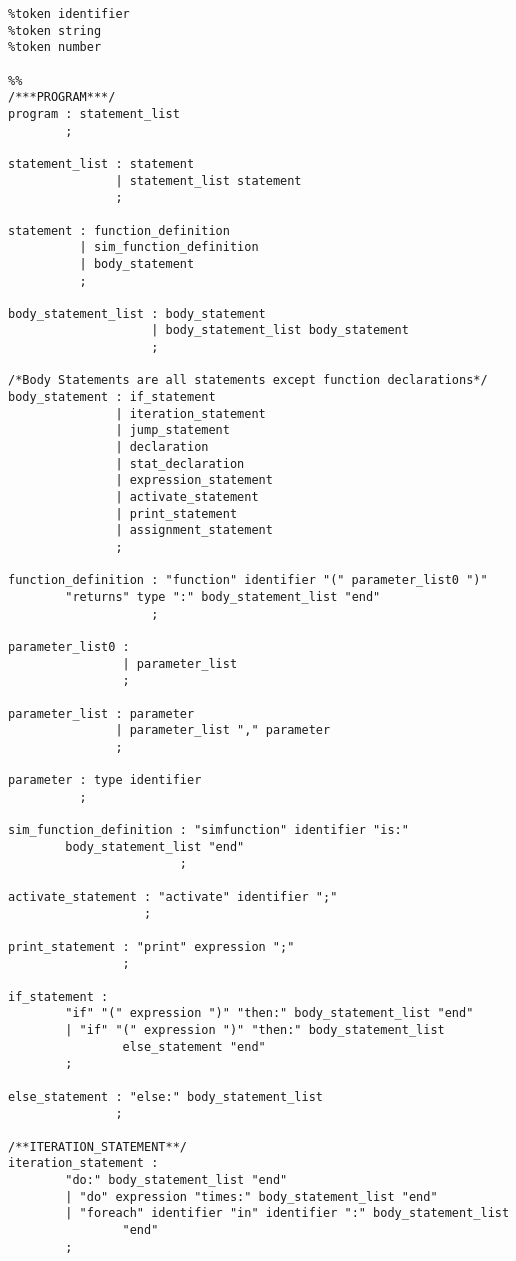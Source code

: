 \begin{singlespacing}
\begin{verbatim}
%token identifier
%token string
%token number

%%
/***PROGRAM***/
program : statement_list
        ;

statement_list : statement
               | statement_list statement
               ;

statement : function_definition
          | sim_function_definition
          | body_statement
          ;

body_statement_list : body_statement
                    | body_statement_list body_statement
                    ;

/*Body Statements are all statements except function declarations*/
body_statement : if_statement
               | iteration_statement
               | jump_statement
               | declaration
               | stat_declaration
               | expression_statement
               | activate_statement
               | print_statement
               | assignment_statement
               ;

function_definition : "function" identifier "(" parameter_list0 ")"
        "returns" type ":" body_statement_list "end"
                    ;

parameter_list0 :
                | parameter_list
                ;

parameter_list : parameter
               | parameter_list "," parameter
               ;

parameter : type identifier
          ;

sim_function_definition : "simfunction" identifier "is:"
        body_statement_list "end" 
                        ;

activate_statement : "activate" identifier ";"
                   ;

print_statement : "print" expression ";"
                ;

if_statement : 
        "if" "(" expression ")" "then:" body_statement_list "end"
        | "if" "(" expression ")" "then:" body_statement_list
                else_statement "end"
        ;

else_statement : "else:" body_statement_list
               ;

/**ITERATION_STATEMENT**/
iteration_statement : 
        "do:" body_statement_list "end"
        | "do" expression "times:" body_statement_list "end"
        | "foreach" identifier "in" identifier ":" body_statement_list
                "end"
        ;


\end{verbatim}
\end{singlespacing}
